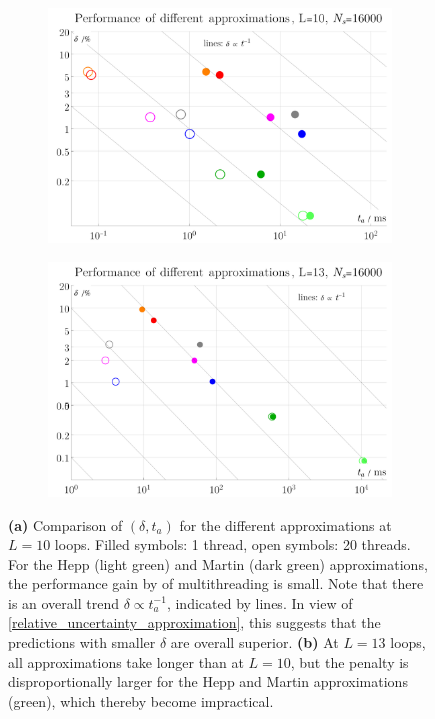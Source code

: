 \documentclass[12pt]{article}
\numberwithin{equation}{section}
\begin{document}
\begin{figure}[htb]
	
	\begin{subfigure}{ .49 \linewidth}
		\centering
		\includegraphics[width=\linewidth]{figures/performance_L10}
		\subcaption{}
		\label{fig:performance_L10}
	\end{subfigure}
	\begin{subfigure}{ .49 \linewidth}
		\centering
		\includegraphics[width=\linewidth]{figures/performance_L13}
		\subcaption{}
		\label{fig:performance_L13}
	\end{subfigure}
	\caption{ 
		\textbf{(a)} Comparison of $(\delta, t_a)$ for the different approximations at $L=10$ loops. Filled symbols: 1 thread, open symbols: 20 threads. For the Hepp (light green) and Martin (dark green) approximations, the performance gain by of multithreading is small. Note that there is an overall trend $\delta \propto t_a^{-1}$, indicated by lines. In view of \cref{relative_uncertainty_approximation}, this suggests that the predictions with smaller $\delta$ are overall superior.  
		\textbf{(b)} At $L=13$ loops, all approximations take longer than at $L=10$, but the penalty is disproportionally larger for the Hepp and Martin approximations (green), which thereby become impractical.  }
	\label{fig:performance}
\end{figure}
\end{document}
